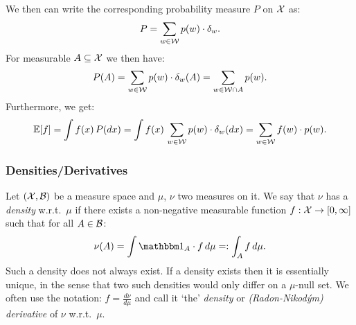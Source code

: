 \begin{Eg}
\begin{enumerate}
            We then can write the corresponding probability measure $P$ on $\mathcal{X}$ as: %
            \[  P = \sum_{w \in \mathcal{W}} p(w) \cdot \delta_{w}.\]
            For measurable $A \subseteq \mathcal{X}$ we then have:
             \[ P(A) = \sum_{w \in \mathcal{W}} p(w) \cdot \delta_{w}(A) = \sum_{w \in \mathcal{W} \cap A} p(w). \]
            Furthermore, we get:
            \[ \mathbb{E}[f] = \int f(x)\, P(dx) = \int f(x)\,\sum_{w \in \mathcal{W}} p(w) \cdot \delta_{w}(dx) = \sum_{w \in \mathcal{W}} f(w) \cdot p(w). \]
    \end{enumerate}
\end{Eg}






\subsubsection{Densities/Derivatives}

\begin{Def}
    Let $(\mathcal{X},\mathcal{B})$ be a measure space and $\mu$, $\nu$ two measures on it.
    We say that $\nu$ has a \emph{density} w.r.t.\ $\mu$ if there exists a non-negative measurable function $f: \mathcal{X} \to [0,\infty]$ such that for all $A \in \mathcal{B}$:
    \[ \nu(A) = \int \I_A\cdot f \, d\mu =:\int_A f \, d\mu  .\]
    Such a density does not always exist.
    If a density exists then it is essentially unique, in the sense that two such densities would only differ on a $\mu$-null set.
    We often use the notation: $f=\frac{d\nu}{d\mu}$ and call it `the' \emph{density} or \emph{(Radon-Nikod\'ym) derivative} of $\nu$ w.r.t.\ $\mu$.
\end{Def}

